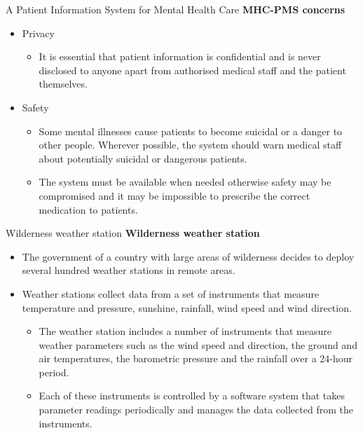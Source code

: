\documentclass{beamer}
\begin{document}
\begin{frame}{A Patient Information System for Mental Health Care}
	\textbf{MHC-PMS concerns}
	\begin{itemize}
		\item Privacy
	\begin{itemize}
		\item It is essential that patient information is confidential and is never disclosed to anyone apart from authorised medical staff and the patient themselves. 
	\end{itemize}
		\item Safety
		\begin{itemize}
			\item Some mental illnesses cause patients to become suicidal or a danger to other people. Wherever possible, the system should warn medical staff about potentially suicidal or dangerous patients. 
			\item The system must be available when needed otherwise safety may be compromised and it may be impossible to prescribe the correct medication to patients. 
		\end{itemize}
	\end{itemize}
\end{frame}
\begin{frame}{Wilderness weather station}
	\textbf{Wilderness weather station}
\begin{itemize}
	\item The government of a country with large areas of wilderness decides to deploy several hundred weather stations in remote areas. 
	\item Weather stations collect data from a set of instruments that measure temperature and pressure, sunshine, rainfall, wind speed and wind direction.

	\begin{itemize}
		\item The weather station includes a number of instruments that measure weather parameters such as the wind speed and direction, the ground and air temperatures, the barometric pressure and the rainfall over a 24-hour period. 
		\item Each of these instruments is controlled by a software system that takes parameter readings periodically and manages the data collected from the instruments.  
	\end{itemize}
\end{itemize}
\end{frame}
\end{document}
